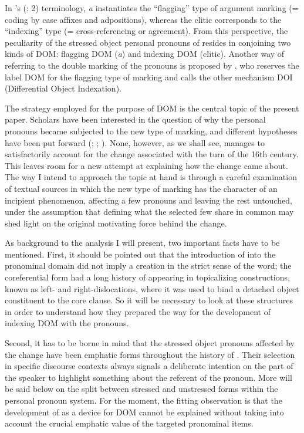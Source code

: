 \documentclass[output=paper]{LSP/langsci}
\begin{document}
 In \citeauthor{Haspelmath2005Argument}'s (\citeyear{Haspelmath2005Argument}: 2) 
 terminology,  \textit{a} instantiates the “flagging” type of argument marking (= coding by case affixes and adpositions), whereas the clitic corresponds to the “indexing” type (= cross-referencing or agreement). From this perspective, the peculiarity of the stressed object personal pronouns of  resides in conjoining two kinds of DOM: flagging DOM (\textit{a}) and indexing DOM (clitic). Another way of referring to the double marking of the  pronouns is proposed by \citet{Iemmolo2014Dislocated}, who reserves the label DOM for the flagging type of marking and calls the other mechanism DOI (Differential Object Indexation).

 The  strategy employed for the purpose of  DOM is the central topic of the present paper. Scholars have been interested in the question of why the personal pronouns became subjected to the new type of marking, and different hypotheses have been put forward (\citealt{Silva-Corvalan1984Semantic}; \citealt{Rini1991Redundant}; \citealt{Gabrieletal2010Information}). None, however, as we shall see, manages to satisfactorily account for the change associated with the turn of the 16th century. This leaves room for a new attempt at explaining how the change came about. The way I intend to approach the topic at hand is through a careful examination of textual sources in which the new type of marking has the character of an incipient phenomenon, affecting a few pronouns and leaving the rest untouched, under the assumption that defining what the selected few share in common may shed light on the original motivating force behind the change. 

   
 As background to the analysis I will present, two important facts have to be mentioned. First, it should be pointed out that the introduction of  into the pronominal domain did not imply a creation in the strict sense of the word; the coreferential form had a long history of appearing in topicalizing constructions, known as left- and right-dislocations, where it was used to bind a detached object constituent to the core clause. So it will be necessary to look at these structures in order to understand how they prepared the way for the development of indexing DOM with the pronouns.

 Second, it has to be borne in mind that the stressed object pronouns affected by the change have been emphatic forms throughout the history of . Their selection in specific discourse contexts always signals a deliberate intention on the part of the speaker to highlight something about the referent of the pronoun. More will be said below on the split between stressed and unstressed forms within the  personal pronoun system. For the moment, the fitting observation is that the development of  as a device for DOM cannot be explained without taking into account the crucial emphatic value of the targeted pronominal items.
\end{document}
